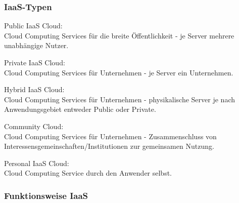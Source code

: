 \documentclass[12pt,a4paper,bibliography=totocnumbered,listof=totocnumbered]{scrartcl}
\begin{document}
\subsubsection{IaaS-Typen}
\begin{compactitem}
\item Public IaaS Cloud:\\
Cloud Computing Services für die breite Öffentlichkeit - je Server mehrere unabhängige Nutzer.
\item Private IaaS Cloud:\\
Cloud Computing Services für Unternehmen - je Server ein Unternehmen.
\item Hybrid IaaS Cloud:\\
Cloud Computing Services für Unternehmen - physikalische Server je nach Anwendungsgebiet entweder Public oder Private.
\item Community Cloud:\\
Cloud Computing Services für Unternehmen - Zusammenschluss von Interessensgemeinschaften/Institutionen zur gemeinsamen Nutzung.
\item Personal IaaS Cloud:\\
Cloud Computing Service durch den Anwender selbst.
\end{compactitem}
\pagebreak

\subsubsection{Funktionsweise IaaS}
\end{document}
